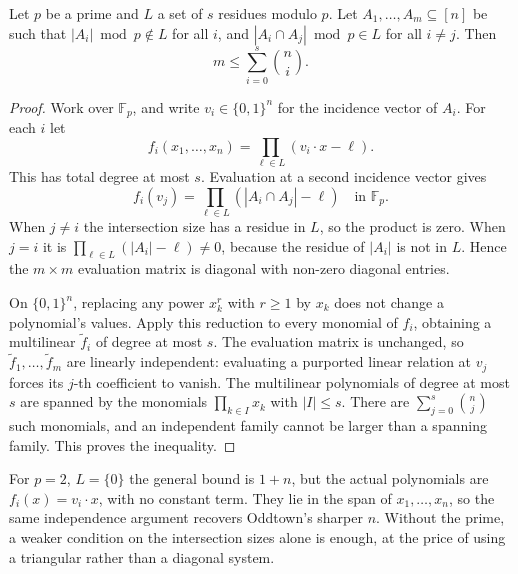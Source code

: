 \begin{theorem}\label{combinatorial:thm:fwmod}
Let $p$ be a prime and $L$ a set of $s$ residues modulo $p$. Let $A_1,\dots,A_m\subseteq[n]$ be such that $|A_i|\bmod p\notin L$ for all $i$, and $|A_i\cap A_j|\bmod p\in L$ for all $i\ne j$. Then
\[
m\le\sum_{i=0}^s\binom ni.
\]
\end{theorem}
\begin{proof}
Work over $\mathbb F_p$, and write $v_i\in\{0,1\}^n$
for the incidence vector of $A_i$. For each $i$ let
\[
f_i(x_1,\ldots,x_n)
=\prod_{\ell\in L}(v_i\cdot x-\ell).
\]
This has total degree at most $s$. Evaluation at a
second incidence vector gives
\[
f_i(v_j)=\prod_{\ell\in L}(|A_i\cap A_j|-\ell)
\quad\text{in }\mathbb F_p.
\]
When $j\ne i$ the intersection size has a residue in $L$,
so the product is zero. When $j=i$ it is
$\prod_{\ell\in L}(|A_i|-\ell)\ne0$, because
the residue of $|A_i|$ is not in $L$. Hence the
$m\times m$ evaluation matrix is diagonal with
non-zero diagonal entries.

On $\{0,1\}^n$, replacing any power $x_k^r$ with
$r\ge1$ by $x_k$ does not change a polynomial's
values. Apply this reduction to every monomial of
$f_i$, obtaining a multilinear $\widetilde f_i$ of
degree at most $s$. The evaluation matrix is unchanged,
so $\widetilde f_1,\ldots,\widetilde f_m$ are
linearly independent: evaluating a purported linear
relation at $v_j$ forces its $j$-th coefficient to
vanish. The multilinear polynomials of degree at most
$s$ are spanned by the monomials
$\prod_{k\in I}x_k$ with $|I|\le s$.
There are $\sum_{j=0}^{s}\binom nj$ such monomials,
and an independent family cannot be larger than a
spanning family. This proves the inequality.
\end{proof}

For $p=2$, $L=\{0\}$ the general bound is $1+n$, but the actual
polynomials are $f_i(x)=v_i\cdot x$, with no constant term. They lie in
the span of $x_1,\dots,x_n$, so the same independence argument recovers
Oddtown's sharper $n$. Without the prime, a weaker condition on the intersection sizes alone is enough, at the price of using a triangular
rather than a diagonal system.


